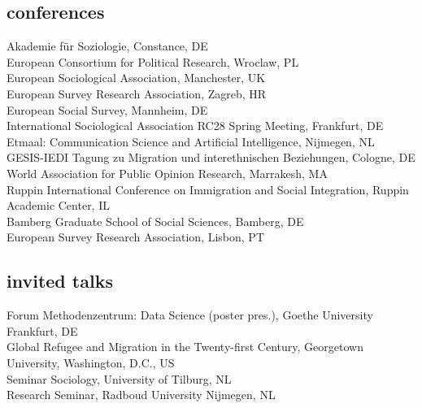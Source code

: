 \documentclass[11pt, a4paper]{article}
\newcommand{\years}[1]{\marginnote{~~#1}}
\begin{document}
\subsection*{conferences}
\noindent
\years{2019}Akademie für Soziologie, Constance, DE\\
European Consortium for Political Research, Wroclaw, PL\\
European Sociological Association, Manchester, UK\\
European Survey Research Association, Zagreb, HR\\
European Social Survey, Mannheim, DE\\
International Sociological Association RC28 Spring Meeting, Frankfurt, DE\\
Etmaal: Communication Science and Artificial Intelligence, Nijmegen, NL\\
\years{2018}GESIS-IEDI Tagung zu Migration und interethnischen Beziehungen, Cologne, DE\\
World Association for Public Opinion Research, Marrakesh, MA\\
Ruppin International Conference on Immigration and Social Integration, Ruppin Academic Center, IL\\
\years{2017}%
Bamberg Graduate School of Social Sciences, Bamberg, DE\\
European Survey Research Association, Lisbon, PT\\
\subsection*{invited talks}
\noindent
\years{2019}%
Forum Methodenzentrum: Data Science (poster pres.), Goethe University Frankfurt, DE\\
\years{2018}Global Refugee and Migration in the Twenty-first Century, Georgetown University, Washington, D.C., US\\
Seminar Sociology, University of Tilburg, NL\\
Research Seminar, Radboud University Nijmegen, NL
\end{document}

